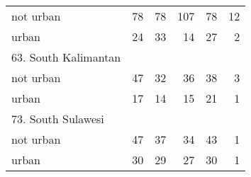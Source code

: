 \begin{table}[!h]
\begin{tabular}{llllll}
\multicolumn{1}{l}{\hspace{1em}not urban} &
  \multicolumn{1}{|r}{78} &
  \multicolumn{1}{r}{78} &
  \multicolumn{1}{r}{107} &
  \multicolumn{1}{r}{78} &
  \multicolumn{1}{r}{12} \\
\multicolumn{1}{l}{\hspace{1em}urban} &
  \multicolumn{1}{|r}{24} &
  \multicolumn{1}{r}{33} &
  \multicolumn{1}{r}{14} &
  \multicolumn{1}{r}{27} &
  \multicolumn{1}{r}{2} \\
\multicolumn{1}{l}{63. South Kalimantan} &
  \multicolumn{1}{|r}{} &
  \multicolumn{1}{r}{} &
  \multicolumn{1}{r}{} &
  \multicolumn{1}{r}{} &
  \multicolumn{1}{r}{} \\
\multicolumn{1}{l}{\hspace{1em}not urban} &
  \multicolumn{1}{|r}{47} &
  \multicolumn{1}{r}{32} &
  \multicolumn{1}{r}{36} &
  \multicolumn{1}{r}{38} &
  \multicolumn{1}{r}{3} \\
\multicolumn{1}{l}{\hspace{1em}urban} &
  \multicolumn{1}{|r}{17} &
  \multicolumn{1}{r}{14} &
  \multicolumn{1}{r}{15} &
  \multicolumn{1}{r}{21} &
  \multicolumn{1}{r}{1} \\
\multicolumn{1}{l}{73. South Sulawesi} &
  \multicolumn{1}{|r}{} &
  \multicolumn{1}{r}{} &
  \multicolumn{1}{r}{} &
  \multicolumn{1}{r}{} &
  \multicolumn{1}{r}{} \\
\multicolumn{1}{l}{\hspace{1em}not urban} &
  \multicolumn{1}{|r}{47} &
  \multicolumn{1}{r}{37} &
  \multicolumn{1}{r}{34} &
  \multicolumn{1}{r}{43} &
  \multicolumn{1}{r}{1} \\
\multicolumn{1}{l}{\hspace{1em}urban} &
  \multicolumn{1}{|r}{30} &
  \multicolumn{1}{r}{29} &
  \multicolumn{1}{r}{27} &
  \multicolumn{1}{r}{30} &
  \multicolumn{1}{r}{1} \\
\cline{1-6}
\end{tabular}
\end{table}
